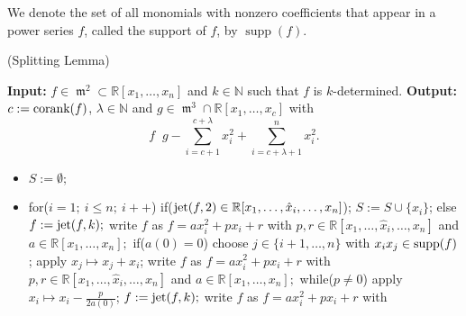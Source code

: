 \documentclass{amsproc}
\DeclareMathOperator{\requiv}{\overset{r}{\sim}}
\DeclareMathOperator{\m}{\mathfrak{m}}
\DeclareMathOperator{\supp}{supp}
\begin{document}
We denote the set of all monomials with nonzero coefficients that appear in a power series $f$, called the support of $f$, by $\supp(f)$.

\begin{AlgorithmSplittingLemma}(Splitting Lemma) \label{AlgorithmSplittingLemma}
\end{AlgorithmSplittingLemma}
\noindent\textnormal{\bf Input:} $f\in \m^2\subset\mathbb
R[x_1,\ldots,x_n]$ and $k\in\mathbb N$ such that $f$ is
$k$-determined.\newline
\textnormal{\bf Output:} $c:=\textnormal{corank}(f)$, $\lambda\in\mathbb
N$ and
$g\in \m^3\cap\mathbb R[x_1,\ldots,x_c]$ with \[\displaystyle
f\requiv g-\sum_{i=c+1}^{c+\lambda} x_i^2+\sum_{i=c+\lambda+1}^nx_i^2.\]
\begin{itemize}
\item $S:=\emptyset;$
\item for($i=1;\ i\le n;\  i++$)\newline
\phantom{}\quad if($\textnormal{jet}(f,2)\in \mathbb R[x_1,\ldots,\hat
x_i,\ldots,x_n]$);\newline
\phantom{}\quad\quad $S:=S\cup\{x_i\}$;\newline
\phantom{}\quad else\newline
\phantom{}\quad\quad $f:=\textnormal{jet}(f,k);$\newline
\phantom{}\quad\quad write $f$ as $f=ax_i^2+px_i+r$ with $p,r\in\mathbb
R[x_1,\ldots,\hat x_i,\ldots,x_n]$\newline
\phantom{}\quad\quad and $a\in\mathbb R[x_1,\ldots,x_n];$\newline
\phantom{}\quad\quad if($a(0)=0$)\newline
\phantom{}\quad\quad\quad choose $j\in\{i+1,\ldots,n\}$ with
$x_ix_j\in\textnormal{supp}(f)$;\newline
\phantom{}\quad\quad\quad apply $x_j\mapsto x_j+x_i$;\newline
\phantom{}\quad\quad\quad write $f$ as $f=ax_i^2+px_i+r$ with $p,r\in\mathbb
R[x_1,\ldots,\hat x_i,\ldots,x_n]$\newline
\phantom{}\quad\quad\quad and $a\in\mathbb R[x_1,\ldots,x_n];$\newline
\phantom{}\quad\quad\quad\quad while($p\neq 0$)\newline
\phantom{}\quad\quad\quad\quad\quad apply $x_i\mapsto
x_i-\frac{p}{2a(0)}$;\newline
\phantom{}\quad\quad\quad\quad\quad $f:=\textnormal{jet}(f,k);$\newline
\phantom{}\quad\quad\quad\quad\quad write $f$ as $f=ax_i^2+px_i+r$ with

\end{itemize}
\end{document}
